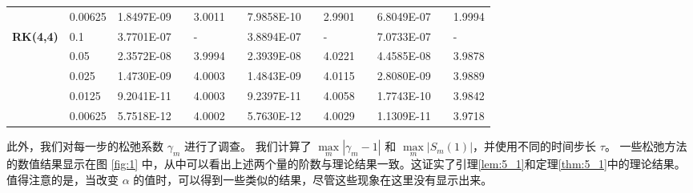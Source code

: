 \begin{table}[H]
\begin{tabular}{lllllrlrlrlrlrl}
	\multicolumn{2}{l}{} & \multicolumn{2}{l}{0.00625} & 1.8497E-09 &       & 3.0011  &       & 7.9858E-10 &       & 2.9901  &       & 6.8049E-07 &       & 1.9994  \\
	\multicolumn{2}{l}{\multirow{5}[1]{*}{\textbf{RK(4,4)}}} & \multicolumn{2}{l}{0.1} & 3.7701E-07 &       & -     &       & 3.8894E-07 &       & -     &       & 7.0733E-07 &       & - \\
	\multicolumn{2}{l}{} & \multicolumn{2}{l}{0.05} & 2.3572E-08 &       & 3.9994  &       & 2.3939E-08 &       & 4.0221  &       & 4.4585E-08 &       & 3.9878  \\
	\multicolumn{2}{l}{} & \multicolumn{2}{l}{0.025} & 1.4730E-09 &       & 4.0003  &       & 1.4843E-09 &       & 4.0115  &       & 2.8080E-09 &       & 3.9889  \\
	\multicolumn{2}{l}{} & \multicolumn{2}{l}{0.0125} & 9.2041E-11 &       & 4.0003  &       & 9.2397E-11 &       & 4.0058  &       & 1.7743E-10 &       & 3.9842  \\
	\multicolumn{2}{l}{} & \multicolumn{2}{l}{0.00625} & 5.7518E-12 &       & 4.0002  &       & 5.7630E-12 &       & 4.0029  &       & 1.1309E-11 &       & 3.9718  \\
	\bottomrule
	\end{tabular}%
	\label{tab:6-1}%
	\end{table}%
	此外，我们对每一步的松弛系数 $\gamma_m$ 进行了调查。
	我们计算了 $\max\limits _m\left|\gamma_m-1\right|$ 和 $\max\limits _m\left|S_m(1)\right|$，并使用不同的时间步长 $\tau$。
	一些松弛方法的数值结果显示在图 \ref{fig:1} 中，从中可以看出上述两个量的阶数与理论结果一致。这证实了引理\ref{lem:5_1}和定理\ref{thm:5_1}中的理论结果。值得注意的是，当改变 $\alpha$ 的值时，可以得到一些类似的结果，尽管这些现象在这里没有显示出来。
	
